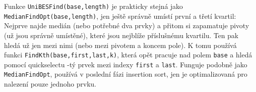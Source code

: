         Funkce {\tt UniBESFind(base,length)} je prakticky stejná jako {\tt MedianFindOpt(base,length)}, jen ještě správně umístí první a třetí kvartil: Nejprve najde medián (nebo potřebné dva prvky) a přitom si zapamatuje pivoty (už jsou správně umístěné), které jsou nejblíže příslušnému kvartilu. Ten pak hledá už jen mezi nimi (nebo mezi pivotem a koncem pole). K tomu používá funkci {\tt FindKth(base,first,last,k)}, která opět pracuje nad polem {\tt base} a hledá pomocí quickselectu \kk-tý prvek mezi indexy {\tt first} a {\tt last}. Funguje podobně jako {\tt MedianFindOpt}, používá v poslední fázi insertion sort, jen je optimalizovaná pro nalezení pouze jednoho prvku.
























